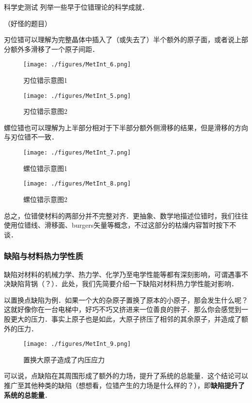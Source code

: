 \begin{exercise}{科学史测试}
列举一些早于位错理论的科学成就．

（好怪的题目）
\end{exercise}

刃位错可以理解为完整晶体中插入了（或失去了）半个额外的原子面，或者说上部分额外多滑移了一个原子间距．
\begin{figure}[ht]
\centering
\texttt{[image: ./figures/MetInt\_6.png]}
\caption{刃位错示意图1} \label{MetInt_fig6}
\end{figure}
\begin{figure}[ht]
\centering
\texttt{[image: ./figures/MetInt\_5.png]}
\caption{刃位错示意图2} \label{MetInt_fig5}
\end{figure}

螺位错也可以理解为上半部分相对于下半部分额外侧滑移的结果，但是滑移的方向与刃位错不一致．
\begin{figure}[ht]
\centering
\texttt{[image: ./figures/MetInt\_7.png]}
\caption{螺位错示意图1} \label{MetInt_fig7}
\end{figure}
\begin{figure}[ht]
\centering
\texttt{[image: ./figures/MetInt\_8.png]}
\caption{螺位错示意图2} \label{MetInt_fig8}
\end{figure}

总之，位错使材料的两部分并不完整对齐．更抽象、数学地描述位错时，我们往往使用位错线、滑移面、burgers矢量等概念，不过这部分的枯燥内容暂时按下不谈．


\subsubsection{缺陷与材料热力学性质}
缺陷对材料的机械力学、热力学、化学乃至电学性能等都有深刻影响，可谓遇事不决缺陷背锅（？）．此处，我们先简要介绍一下缺陷对材料热力学性能对影响．

以置换点缺陷为例．如果一个大的杂原子置换了原本的小原子，那会发生什么呢？这就好像你在一台电梯中，好巧不巧又挤进来一位善良的胖子．那么你会感觉到一股更大的压力．事实上原子也是如此，大原子挤压了相邻的其余原子，并造成了额外的压力．
\begin{figure}[ht]
\centering
\texttt{[image: ./figures/MetInt\_9.png]}
\caption{置换大原子造成了内压应力} \label{MetInt_fig9}
\end{figure}
可以说，点缺陷在其周围形成了额外的力场，提升了系统的总能量．这个结论可以推广至其他种类的缺陷（想想看，位错产生的力场是什么样的？），即\textbf{缺陷提升了系统的总能量}．

